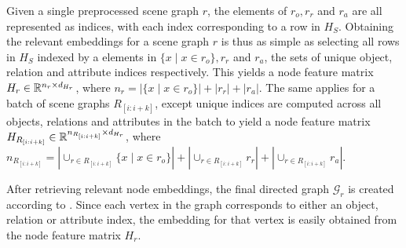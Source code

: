 Given a single preprocessed scene graph \(r\), the elements of \(r_o, r_r\) and \(r_a\) are all represented as indices, with each index corresponding to a row in \(H_S\). Obtaining the relevant embeddings for a scene graph \(r\) is thus as simple as selecting all rows in \(H_S\) indexed by a elements in \(\{x \mid x \in r_o\}, r_r\) and \(r_a\), the sets of unique object, relation and attribute indices respectively. This yields a node feature matrix \(H_r \in \mathbb{R}^{n_r \times d_{H_r}}\), where \(n_r = |\{x \mid x \in r_o\}| + |r_r| + |r_a|\). The same applies for a batch of scene graphs \(R_{[i:i+k]}\), except unique indices are computed across all objects, relations and attributes in the batch to yield a node feature matrix
\(H_{R_{[i:i+k]}} \in \mathbb{R}^{n_{R_{[i:i+k]}} \times d_{H_r}}\), where \(n_{R_{[i:i+k]}} = |\cup_{r \in R_{[i:i+k]}}\{x \mid x \in r_o\}| + |\cup_{r \in R_{[i:i+k]}}r_r| + |\cup_{r \in R_{[i:i+k]}}r_a|\).

After retrieving relevant node embeddings, the final directed graph \(\mathcal{G}_r\) is created according to \algorithmcfname{ \ref{algorithm:scene_graph_construction}}. Since each vertex in the graph corresponds to either an object, relation or attribute index, the embedding for that vertex is easily obtained from the node feature matrix \(H_r\).

